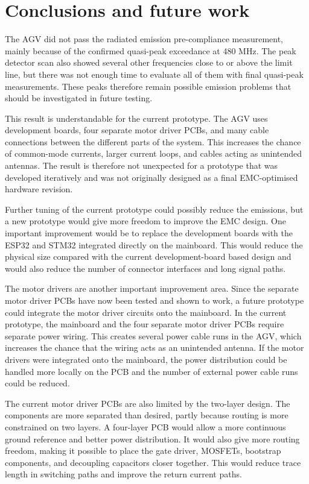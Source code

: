 \section{Conclusions and future work}

The AGV did not pass the radiated emission pre-compliance measurement, mainly because
of the confirmed quasi-peak exceedance at 480 MHz. The peak detector scan also showed
several other frequencies close to or above the limit line, but there was not enough time
to evaluate all of them with final quasi-peak measurements. These peaks therefore remain
possible emission problems that should be investigated in future testing.

This result is understandable for the current prototype. The AGV uses development
boards, four separate motor driver PCBs, and many cable connections between the
different parts of the system. This increases the chance of common-mode currents,
larger current loops, and cables acting as unintended antennas. The result is therefore
not unexpected for a prototype that was developed iteratively and was not originally
designed as a final EMC-optimised hardware revision.

Further tuning of the current prototype could possibly reduce the emissions, but a new
prototype would give more freedom to improve the EMC design. One important improvement
would be to replace the development boards with the ESP32 and STM32 integrated directly
on the mainboard. This would reduce the physical size compared with the current
development-board based design and would also reduce the number of connector
interfaces and long signal paths.

The motor drivers are another important improvement area. Since the separate motor
driver PCBs have now been tested and shown to work, a future prototype could integrate
the motor driver circuits onto the mainboard. In the current prototype, the mainboard
and the four separate motor driver PCBs require separate power wiring. This creates
several power cable runs in the AGV, which increases the chance that the wiring acts as
an unintended antenna. If the motor drivers were integrated onto the mainboard, the
power distribution could be handled more locally on the PCB and the number of external
power cable runs could be reduced.

The current motor driver PCBs are also limited by the two-layer design. The components
are more separated than desired, partly because routing is more constrained on two
layers. A four-layer PCB would allow a more continuous ground reference and better
power distribution. It would also give more routing freedom, making it possible to place
the gate driver, MOSFETs, bootstrap components, and decoupling capacitors closer
together. This would reduce trace length in switching paths and improve the return
current paths.

